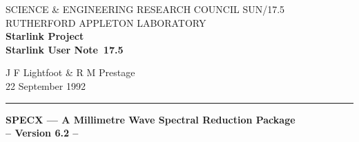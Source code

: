 \pagestyle{myheadings}

\newcommand{\stardoccategory}  {Starlink User Note}
\newcommand{\stardocinitials}  {SUN}
\newcommand{\stardocnumber}    {17.5}
\newcommand{\stardocauthors}   {J F Lightfoot \& R M Prestage}
\newcommand{\stardocdate}      {22 September 1992}
\newcommand{\stardoctitle}     {SPECX --- A Millimetre Wave Spectral Reduction 
				Package \\[2ex] 
				-- Version 6.2 --}

\newcommand{\stardocname}{\stardocinitials /\stardocnumber}
\renewcommand{\_}{{\tt\char'137}}     %
\markright{\stardocname}
\setlength{\textwidth}{160mm}
\setlength{\textheight}{230mm}
\setlength{\topmargin}{-2mm}
\setlength{\oddsidemargin}{0mm}
\setlength{\evensidemargin}{0mm}
\setlength{\parindent}{0mm}
\setlength{\parskip}{\medskipamount}
\setlength{\unitlength}{1mm}



\thispagestyle{empty}
SCIENCE \& ENGINEERING RESEARCH COUNCIL \hfill \stardocname\\
RUTHERFORD APPLETON LABORATORY\\
{\large\bf Starlink Project\\}
{\large\bf \stardoccategory\ \stardocnumber}
\begin{flushright}
\stardocauthors\\
\stardocdate
\end{flushright}
\vspace{-4mm}
\rule{\textwidth}{0.5mm}
\vspace{5mm}
\begin{center}
{\Large\bf \stardoctitle}
\end{center}
\vspace{5mm}


